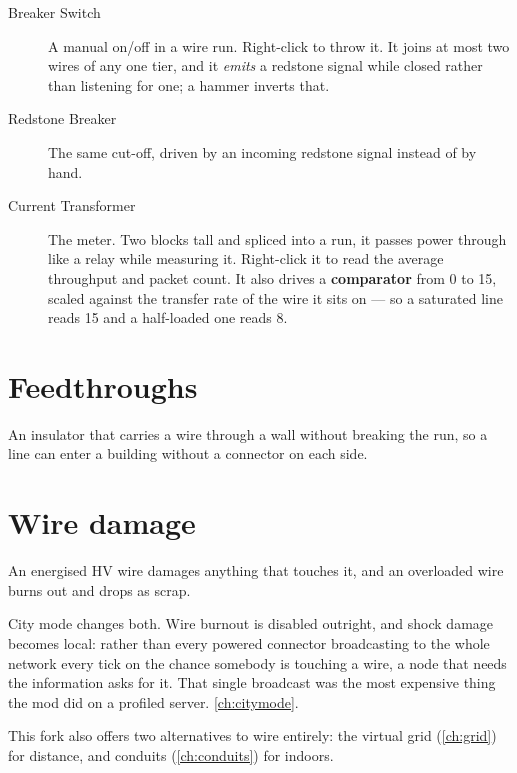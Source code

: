 \begin{description}
\item[Breaker Switch] A manual on/off in a wire run. Right-click to throw it. It joins at most two
      wires of any one tier, and it \emph{emits} a redstone signal while closed rather than
      listening for one; a hammer inverts that.
\item[Redstone Breaker] The same cut-off, driven by an incoming redstone signal instead of by hand.
\item[Current Transformer] The meter. Two blocks tall and spliced into a run, it passes power
      through like a relay while measuring it. Right-click it to read the average throughput and
      packet count. It also drives a \textbf{comparator} from 0 to 15, scaled against the transfer
      rate of the wire it sits on --- so a saturated line reads 15 and a half-loaded one reads 8.
\end{description}

\section{Feedthroughs}

An insulator that carries a wire through a wall without breaking the run, so a line can enter a
building without a connector on each side.

\section{Wire damage}

An energised HV wire damages anything that touches it, and an overloaded wire burns out and drops
as scrap.

\begin{iefork}
City mode changes both. Wire burnout is disabled outright, and shock damage becomes local: rather
than every powered connector broadcasting to the whole network every tick on the chance somebody is
touching a wire, a node that needs the information asks for it. That single broadcast was the most
expensive thing the mod did on a profiled server. \autoref{ch:citymode}.
\end{iefork}

\begin{iefork}
This fork also offers two alternatives to wire entirely: the virtual grid (\autoref{ch:grid}) for
distance, and conduits (\autoref{ch:conduits}) for indoors.
\end{iefork}

